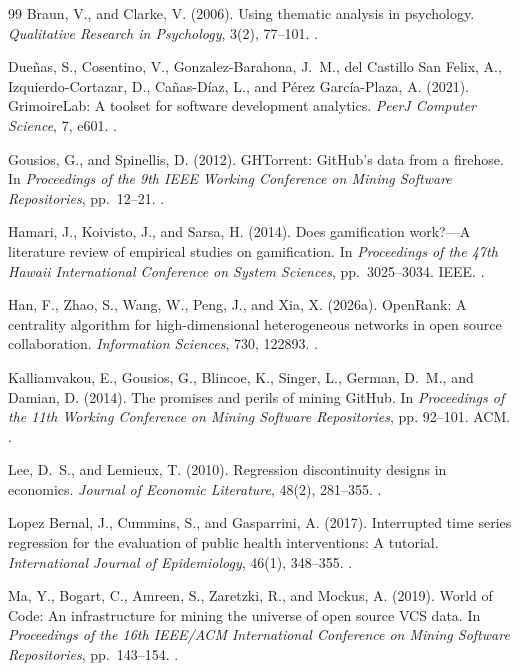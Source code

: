\begin{thebibliography}{99}
\label{refs:chapter06}
Braun, V., and Clarke, V. (2006).
Using thematic analysis in psychology.
\emph{Qualitative Research in Psychology}, 3(2), 77--101.
.

Dueñas, S., Cosentino, V., Gonzalez-Barahona, J.~M., del Castillo San Felix, A., Izquierdo-Cortazar, D., Cañas-Díaz, L., and Pérez García-Plaza, A. (2021).
GrimoireLab: A toolset for software development analytics.
\emph{PeerJ Computer Science}, 7, e601.
.

Gousios, G., and Spinellis, D. (2012).
GHTorrent: GitHub's data from a firehose.
In \emph{Proceedings of the 9th IEEE Working Conference on Mining Software Repositories}, pp.~12--21.
.

Hamari, J., Koivisto, J., and Sarsa, H. (2014).
Does gamification work?---A literature review of empirical studies on gamification.
In \emph{Proceedings of the 47th Hawaii International Conference on System Sciences}, pp.~3025--3034. IEEE.
.

Han, F., Zhao, S., Wang, W., Peng, J., and Xia, X. (2026a).
OpenRank: A centrality algorithm for high-dimensional heterogeneous networks in open source collaboration.
\emph{Information Sciences}, 730, 122893.
.

Kalliamvakou, E., Gousios, G., Blincoe, K., Singer, L., German, D.~M., and Damian, D. (2014).
The promises and perils of mining GitHub.
In \emph{Proceedings of the 11th Working Conference on Mining Software Repositories}, pp. 92--101. ACM.
.

Lee, D.~S., and Lemieux, T. (2010).
Regression discontinuity designs in economics.
\emph{Journal of Economic Literature}, 48(2), 281--355.
.

Lopez Bernal, J., Cummins, S., and Gasparrini, A. (2017).
Interrupted time series regression for the evaluation of public health interventions: A tutorial.
\emph{International Journal of Epidemiology}, 46(1), 348--355.
.

Ma, Y., Bogart, C., Amreen, S., Zaretzki, R., and Mockus, A. (2019).
World of Code: An infrastructure for mining the universe of open source VCS data.
In \emph{Proceedings of the 16th IEEE/ACM International Conference on Mining Software Repositories}, pp.~143--154.
.


\end{thebibliography}
